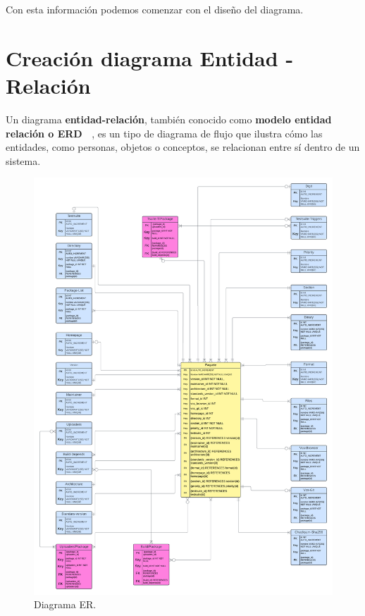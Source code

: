 \documentclass[a4paper, 12pt]{book}
\begin{document}
Con esta información podemos comenzar con el diseño del diagrama.



\section{Creación diagrama Entidad - Relación} 
\label{sec:diagrama_entidad_relacion}
Un diagrama \textbf {entidad-relación}, también conocido como \textbf {modelo entidad relación o ERD ~\cite{lucidchart:_diagramaERD}}, es un tipo de diagrama de flujo que ilustra cómo las entidades, como personas, objetos o conceptos, se relacionan entre sí dentro de un sistema.

\begin{figure}
	\centering
	\includegraphics[width=17cm, keepaspectratio]{img/Diagrama_ER.png}
	\caption{Diagrama ER.}
	\label{fig:entidad_relación}
\end{figure}
\end{document}
